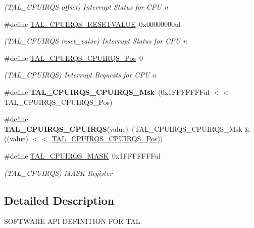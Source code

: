 \begin{DoxyCompactItemize}
\begin{DoxyCompactList}\small\item\em (T\+A\+L\+\_\+\+C\+P\+U\+I\+R\+Q\+S offset) Interrupt Status for C\+P\+U n \end{DoxyCompactList}\item 
\hypertarget{group___s_a_m_l21___t_a_l_ga07f8c38d22a0c12493b0b6b1f277515e}{}\#define \hyperlink{group___s_a_m_l21___t_a_l_ga07f8c38d22a0c12493b0b6b1f277515e}{T\+A\+L\+\_\+\+C\+P\+U\+I\+R\+Q\+S\+\_\+\+R\+E\+S\+E\+T\+V\+A\+L\+U\+E}~0x00000000ul\label{group___s_a_m_l21___t_a_l_ga07f8c38d22a0c12493b0b6b1f277515e}

\begin{DoxyCompactList}\small\item\em (T\+A\+L\+\_\+\+C\+P\+U\+I\+R\+Q\+S reset\+\_\+value) Interrupt Status for C\+P\+U n \end{DoxyCompactList}\item 
\hypertarget{group___s_a_m_l21___t_a_l_gaf87240b1fe2176fc30fb8642d9a6e12c}{}\#define \hyperlink{group___s_a_m_l21___t_a_l_gaf87240b1fe2176fc30fb8642d9a6e12c}{T\+A\+L\+\_\+\+C\+P\+U\+I\+R\+Q\+S\+\_\+\+C\+P\+U\+I\+R\+Q\+S\+\_\+\+Pos}~0\label{group___s_a_m_l21___t_a_l_gaf87240b1fe2176fc30fb8642d9a6e12c}

\begin{DoxyCompactList}\small\item\em (T\+A\+L\+\_\+\+C\+P\+U\+I\+R\+Q\+S) Interrupt Requests for C\+P\+U n \end{DoxyCompactList}\item 
\hypertarget{group___s_a_m_l21___t_a_l_ga3f8e1b6a2c9182435e705aa2f0ecb0de}{}\#define {\bfseries T\+A\+L\+\_\+\+C\+P\+U\+I\+R\+Q\+S\+\_\+\+C\+P\+U\+I\+R\+Q\+S\+\_\+\+Msk}~(0x1\+F\+F\+F\+F\+F\+F\+Ful $<$$<$ T\+A\+L\+\_\+\+C\+P\+U\+I\+R\+Q\+S\+\_\+\+C\+P\+U\+I\+R\+Q\+S\+\_\+\+Pos)\label{group___s_a_m_l21___t_a_l_ga3f8e1b6a2c9182435e705aa2f0ecb0de}

\item 
\hypertarget{group___s_a_m_l21___t_a_l_ga6d51852531cabe8a3403d583e9398068}{}\#define {\bfseries T\+A\+L\+\_\+\+C\+P\+U\+I\+R\+Q\+S\+\_\+\+C\+P\+U\+I\+R\+Q\+S}(value)~(T\+A\+L\+\_\+\+C\+P\+U\+I\+R\+Q\+S\+\_\+\+C\+P\+U\+I\+R\+Q\+S\+\_\+\+Msk \& ((value) $<$$<$ \hyperlink{group___s_a_m_l21___t_a_l_gaf87240b1fe2176fc30fb8642d9a6e12c}{T\+A\+L\+\_\+\+C\+P\+U\+I\+R\+Q\+S\+\_\+\+C\+P\+U\+I\+R\+Q\+S\+\_\+\+Pos}))\label{group___s_a_m_l21___t_a_l_ga6d51852531cabe8a3403d583e9398068}

\item 
\hypertarget{group___s_a_m_l21___t_a_l_gaf2d74610e961232a3cfe10ae4c2e2ff6}{}\#define \hyperlink{group___s_a_m_l21___t_a_l_gaf2d74610e961232a3cfe10ae4c2e2ff6}{T\+A\+L\+\_\+\+C\+P\+U\+I\+R\+Q\+S\+\_\+\+M\+A\+S\+K}~0x1\+F\+F\+F\+F\+F\+F\+Ful\label{group___s_a_m_l21___t_a_l_gaf2d74610e961232a3cfe10ae4c2e2ff6}

\begin{DoxyCompactList}\small\item\em (T\+A\+L\+\_\+\+C\+P\+U\+I\+R\+Q\+S) M\+A\+S\+K Register \end{DoxyCompactList}\end{DoxyCompactItemize}


\subsection{Detailed Description}
S\+O\+F\+T\+W\+A\+R\+E A\+P\+I D\+E\+F\+I\+N\+I\+T\+I\+O\+N F\+O\+R T\+A\+L 